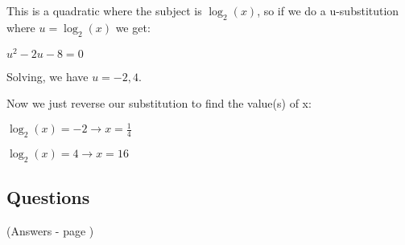 \documentclass[../main.tex]{subfiles}
\begin{document}
This is a quadratic where the subject is $\log_2(x)$, so if we do a u-substitution where $u=\log_2(x)$ we get:

\(u^2-2u-8=0\)

Solving, we have $u=-2, 4$.

Now we just reverse our substitution to find the value(s) of x:

\(\log_2(x)=-2 \rightarrow x=\frac{1}{4}\)

\(\log_2(x)=4 \rightarrow x=16\)


\pagebreak

\subsection*{Questions}
(Answers - page {\pageref*{Log problems answers}})
\label{Log problems}
\end{document}
